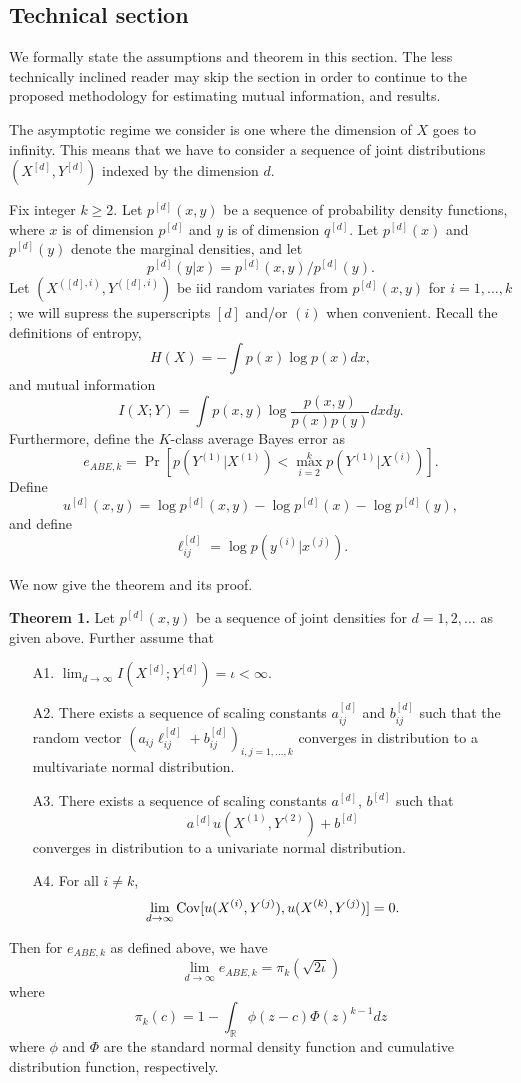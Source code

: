 \documentclass[12pt]{article}
\begin{document}
\subsection{Technical section}

We formally state the assumptions and theorem in this section.  The
less technically inclined reader may skip the section in order to
continue to the proposed methodology for estimating mutual
information, and results.

The asymptotic regime we consider is one where the dimension of $X$ goes to infinity.
This means that we have to consider a sequence of joint distributions $(X^{[d]}, Y^{[d]})$ indexed by the dimension $d$.

Fix integer $k \geq 2$.  Let $p^{[d]}(x,y)$ be a sequence of
probability density functions, where $x$ is of dimension $p^{[d]}$ and
$y$ is of dimension $q^{[d]}$.  Let $p^{[d]}(x)$ and $p^{[d]}(y)$
denote the marginal densities, and let
\[
p^{[d]}(y|x) = p^{[d]}(x, y)/p^{[d]}(y).\]
 Let $(X^{([d], i)}, Y^{([d], i)})$ be
iid random variates from $p^{[d]}(x, y)$ for $i = 1, \hdots, k$; we will supress the
superscripts $[d]$ and/or $(i)$ when convenient.  Recall the definitions of
entropy,
\[
H(X) = -\int p(x) \log p(x) dx,
\]
and mutual information
\[
I(X; Y) = \int p(x, y) \log \frac{p(x, y)}{p(x)p(y)} dx dy.
\]
Furthermore, define the $K$-class average Bayes error as
\[
e_{ABE, k} = \Pr[p(Y^{(1)}|X^{(1)}) < \max_{i = 2}^{k} p(Y^{(1)}|X^{(i)})].
\]
Define
\[
u^{[d]}(x, y) = \log p^{[d]}(x, y) - \log p^{[d]}(x) - \log p^{[d]}(y),
\]
and define
\[
\ell_{ij}^{[d]} = \log p(y^{(i)}|x^{(j)}).
\]



We now give the theorem and its proof.

\textbf{Theorem 1.} Let $p^{[d]}(x, y)$ be a sequence of joint densities
for $d = 1,2,\hdots$ as given above.  Further assume that
\begin{itemize}
\item[A1.] $\lim_{d \to \infty} I(X^{[d]}; Y^{[d]}) = \iota < \infty.$
\item[A2.] There exists a sequence of scaling constants $a_{ij}^{[d]}$
and $b_{ij}^{[d]}$ such that the random vector $(a_{ij}\ell_{ij}^{[d]} +
b_{ij}^{[d]})_{i, j = 1,\hdots, k}$ converges in distribution to a
multivariate normal distribution.
\item[A3.] There exists a sequence of scaling constants $a^{[d]}$, $b^{[d]}$ such that
\[
a^{[d]}u(X^{(1)}, Y^{(2)}) + b^{[d]}
\]
converges in distribution to a univariate normal distribution.
\item[A4.] For all $i \neq k$,
\[\lim_{d \to \infty}\text{Cov}[u(X^{(i)}, Y^{(j)}), u(X^{(k)}, Y^{(j)})] = 0.\]
\end{itemize}
Then for $e_{ABE, k}$ as defined above, we have
\[
\lim_{d \to \infty} e_{ABE, k} = \pi_k(\sqrt{2 \iota})
\]
where
\[
\pi_k(c) = 1 - \int_{\mathbb{R}} \phi(z - c)  \Phi(z)^{k-1} dz
\]
where $\phi$ and $\Phi$ are the standard normal density function and
cumulative distribution function, respectively.
\end{document}
